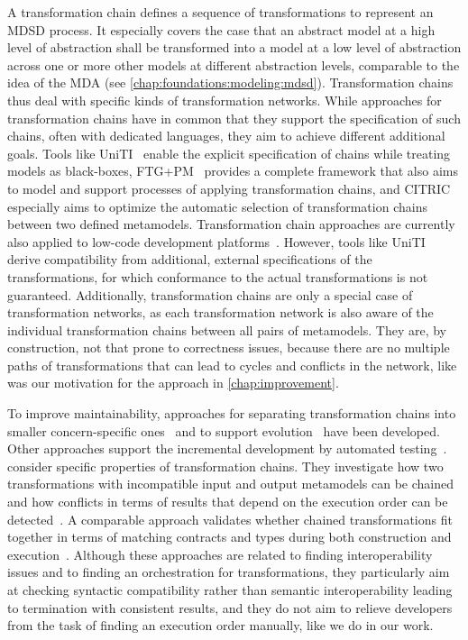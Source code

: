 A transformation chain defines a sequence of transformations to represent an \gls{MDSD} process.
It especially covers the case that an abstract model at a high level of abstraction shall be transformed into a model at a low level of abstraction across one or more other models at different abstraction levels, comparable to the idea of the \gls{MDA} (see \autoref{chap:foundations:modeling:mdsd}).
Transformation chains thus deal with specific kinds of transformation networks.
While approaches for transformation chains have in common that they support the specification of such chains, often with dedicated languages, they aim to achieve different additional goals.
Tools like UniTI~\cite{vanhooff2006a, vanhooff2007UniTI-MODELS, pilgrim2008constructingChains-ECMDA} enable the explicit specification of chains while treating models as black-boxes, FTG+PM~\cite{lucio2013FTGPM-SDL} provides a complete framework that also aims to model and support processes of applying transformation chains, and CITRIC~\cite{basciani2018chains-MODELS} especially aims to optimize the automatic selection of transformation chains between two defined metamodels.
Transformation chain approaches are currently also applied to low-code development platforms~\cite{sahay2020TransformationCompositionLowCode-Models}.
However, tools like UniTI derive compatibility from additional, external specifications of the transformations, for which conformance to the actual transformations is not guaranteed.
Additionally, transformation chains are only a special case of transformation networks, as each transformation network is also aware of the individual transformation chains between all pairs of metamodels.
They are, by construction, not that prone to correctness issues, because there are no multiple paths of transformations that can lead to cycles and conflicts in the network, like was our motivation for the \commonalities approach in \autoref{chap:improvement}.

To improve maintainability, approaches for separating transformation chains into smaller concern-specific ones~\cite{yie2012a} and to support evolution~\cite{yie2009a} have been developed.
Other approaches support the incremental development by automated testing~\cite{kuester2009incremetalChainDevelopment-MODELS}.
 consider specific properties of transformation chains.
They investigate how two transformations with incompatible input and output metamodels can be chained~\cite{etien2010Combining-SAC} and how conflicts in terms of results that depend on the execution order can be detected~\cite{etien2012Chaining-AMT}.
A comparable approach validates whether chained transformations fit together in terms of matching contracts and types during both construction and execution~\cite{heidenreich2010compositionTransformations-ICMT}.
Although these approaches are related to finding interoperability issues and to finding an orchestration for transformations, they particularly aim at checking syntactic compatibility rather than semantic interoperability leading to termination with consistent results, and they do not aim to relieve developers from the task of finding an execution order manually, like we do in our work.


